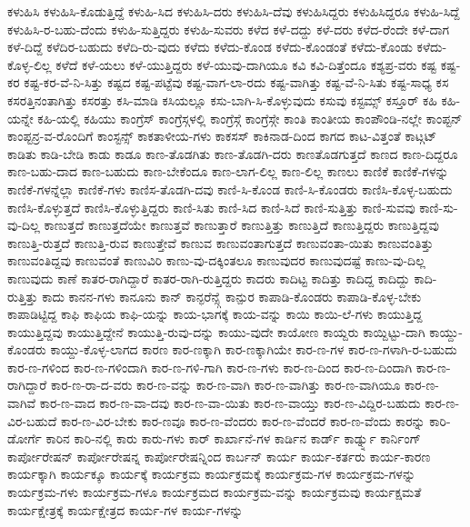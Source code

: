 {ಕಳುಹಿಸಿ
ಕಳುಹಿಸಿ-ಕೊಡುತ್ತಿದ್ದೆ
ಕಳುಹಿ-ಸಿದ
ಕಳುಹಿಸಿ-ದರು
ಕಳುಹಿಸಿ-ದೆವು
ಕಳುಹಿಸಿದ್ದರು
ಕಳುಹಿಸಿದ್ದರೂ
ಕಳುಹಿ-ಸಿದ್ದೆ
ಕಳುಹಿಸಿ-ರ-ಬಹು-ದೆಂದು
ಕಳುಹಿ-ಸುತ್ತಿದ್ದರು
ಕಳುಹಿ-ಸುವರು
ಕಳೆದ
ಕಳೆ-ದದ್ದು
ಕಳೆ-ದರು
ಕಳೆದ-ರೆಂದೇ
ಕಳೆ-ದಾಗ
ಕಳೆ-ದಿದ್ದೆ
ಕಳೆದಿರ-ಬಹುದು
ಕಳೆದಿ-ರು-ವುದು
ಕಳೆದು
ಕಳೆದು-ಕೊಂಡ
ಕಳೆದು-ಕೊಂಡಂತೆ
ಕಳೆದು-ಕೊಂಡು
ಕಳೆದು-ಕೊಳ್ಳ-ಲಿಲ್ಲ
ಕಳೆದೆ
ಕಳೆ-ಯಲು
ಕಳೆ-ಯುತ್ತಿದ್ದರು
ಕಳೆ-ಯುವು-ದಾಗಿಯೂ
ಕವಿ
ಕವಿ-ದಿತ್ತೆಂದೂ
ಕಶ್ಯಪ್ರ-ವರು
ಕಷ್ಟ
ಕಷ್ಟ-ಕರ
ಕಷ್ಟ-ಕರ-ವೆ-ನಿ-ಸಿತ್ತು
ಕಷ್ಟದ
ಕಷ್ಟ-ಪಟ್ಟೆವು
ಕಷ್ಟ-ವಾಗ-ಲಾ-ರದು
ಕಷ್ಟ-ವಾಗಿತ್ತು
ಕಷ್ಟ-ವೆ-ನಿ-ಸಿತು
ಕಷ್ಟ-ಸಾಧ್ಯ
ಕಸ
ಕಸರತ್ತಿನಂತಾಗಿತ್ತು
ಕಸರತ್ತು
ಕಸಿ-ಮಾಡಿ
ಕಸಿಯಲ್ಲೂ
ಕಸು-ಬಾಗಿ-ಸಿ-ಕೊಳ್ಳುವುದು
ಕಸುವು
ಕಸ್ಟಮ್ಸ್
ಕಸ್ತೂರ್
ಕಹಿ
ಕಹಿ-ಯನ್ನೇ
ಕಹಿ-ಯಲ್ಲಿ
ಕಹಿಯು
ಕಾಂಗ್ರೆಸ್
ಕಾಂಗ್ರೆಸ್ಗಳಲ್ಲಿ
ಕಾಂಗ್ರೆಸ್ಗೆ
ಕಾಂಗ್ರೆಸ್ಗೇ
ಕಾಂತಿ
ಕಾಂತೀಯ
ಕಾಂಪೌಂಡಿ-ನಲ್ಲೇ
ಕಾಂಪ್ಟನ್
ಕಾಂಪ್ಟನ್ರ-ವ-ರೊಂದಿಗೆ
ಕಾಂಸ್ಟನ್ಸ್
ಕಾಕತಾಳೀಯ-ಗಳು
ಕಾಕಸಸ್
ಕಾಕಿನಾಡ-ದಿಂದ
ಕಾಗದ
ಕಾಟ-ವಿತ್ತಂತೆ
ಕಾಟ್ಗಟ್
ಕಾಡಿತು
ಕಾಡಿ-ಬೇಡಿ
ಕಾಡು
ಕಾಡೂ
ಕಾಣ-ತೊಡಗಿತು
ಕಾಣ-ತೊಡಗಿ-ದರು
ಕಾಣತೊಡಗುತ್ತದೆ
ಕಾಣದ
ಕಾಣ-ದಿದ್ದರೂ
ಕಾಣ-ಬಹು-ದಾದ
ಕಾಣ-ಬಹುದು
ಕಾಣ-ಬೇಕೆಂದೂ
ಕಾಣ-ಲಾಗ-ಲಿಲ್ಲ
ಕಾಣ-ಲಿಲ್ಲ
ಕಾಣಲು
ಕಾಣಿಕೆ
ಕಾಣಿಕೆ-ಗಳನ್ನು
ಕಾಣಿಕೆ-ಗಳನ್ನೆಲ್ಲಾ
ಕಾಣಿಕೆ-ಗಳು
ಕಾಣಿಸ-ತೊಡಗಿ-ದವು
ಕಾಣಿ-ಸಿ-ಕೊಂಡ
ಕಾಣಿ-ಸಿ-ಕೊಂಡರು
ಕಾಣಿಸಿ-ಕೊಳ್ಳ-ಬಹುದು
ಕಾಣಿಸಿ-ಕೊಳ್ಳುತ್ತದೆ
ಕಾಣಿಸಿ-ಕೊಳ್ಳುತ್ತಿದ್ದರು
ಕಾಣಿ-ಸಿತು
ಕಾಣಿ-ಸಿದ
ಕಾಣಿ-ಸಿದೆ
ಕಾಣಿ-ಸುತ್ತಿತ್ತು
ಕಾಣಿ-ಸುವವು
ಕಾಣಿ-ಸು-ವು-ದಿಲ್ಲ
ಕಾಣುತ್ತದೆ
ಕಾಣುತ್ತದೆಯೇ
ಕಾಣುತ್ತವೆ
ಕಾಣುತ್ತಾರೆ
ಕಾಣುತ್ತಿತ್ತು
ಕಾಣುತ್ತಿದೆ
ಕಾಣುತ್ತಿದ್ದರು
ಕಾಣುತ್ತಿದ್ದವು
ಕಾಣುತ್ತಿ-ರುತ್ತದೆ
ಕಾಣುತ್ತಿ-ರುವ
ಕಾಣುತ್ತೇವೆ
ಕಾಣುವ
ಕಾಣುವಂತಾಗುತ್ತದೆ
ಕಾಣುವಂತಾ-ಯಿತು
ಕಾಣುವಂತಿತ್ತು
ಕಾಣುವಂತಿದ್ದವು
ಕಾಣುವಂತೆ
ಕಾಣುವಿರಿ
ಕಾಣು-ವು-ದಕ್ಕಿಂತಲೂ
ಕಾಣುವುದರ
ಕಾಣುವುದಷ್ಟೆ
ಕಾಣು-ವು-ದಿಲ್ಲ
ಕಾಣುವುದು
ಕಾಣೆ
ಕಾತರ-ರಾಗಿದ್ದಾರೆ
ಕಾತರ-ರಾಗಿ-ರುತ್ತಿದ್ದರು
ಕಾದರು
ಕಾದಿಟ್ಟ
ಕಾದಿತ್ತು
ಕಾದಿದ್ದ
ಕಾದಿದ್ದು
ಕಾದಿ-ರುತ್ತಿತ್ತು
ಕಾದು
ಕಾನನ-ಗಳು
ಕಾನೂನು
ಕಾನ್
ಕಾನ್ಫರೆನ್ಸ್ಗೆ
ಕಾನ್ಪುರ
ಕಾಪಾಡಿ-ಕೊಂಡರು
ಕಾಪಾಡಿ-ಕೊಳ್ಳ-ಬೇಕು
ಕಾಪಾಡಿಟ್ಟಿದ್ದ
ಕಾಫಿ
ಕಾಫಿಯ
ಕಾಫಿ-ಯನ್ನು
ಕಾಯ-ಭಾಗಕ್ಕೆ
ಕಾಯ-ವನ್ನು
ಕಾಯಿ
ಕಾಯಿ-ಲೆ-ಗಳು
ಕಾಯುತ್ತಿದ್ದ
ಕಾಯುತ್ತಿದ್ದವು
ಕಾಯುತ್ತಿದ್ದೇನೆ
ಕಾಯುತ್ತಿ-ರುವು-ದನ್ನು
ಕಾಯು-ವುದೇ
ಕಾಯೋಣ
ಕಾಯ್ದರು
ಕಾಯ್ದಿಟ್ಟು-ದಾಗಿ
ಕಾಯ್ದು-ಕೊಂಡರು
ಕಾಯ್ದು-ಕೊಳ್ಳ-ಲಾಗದ
ಕಾರಣ
ಕಾರ-ಣಕ್ಕಾಗಿ
ಕಾರ-ಣಕ್ಕಾಗಿಯೇ
ಕಾರ-ಣ-ಗಳ
ಕಾರ-ಣ-ಗಳಾಗಿ-ರ-ಬಹುದು
ಕಾರ-ಣ-ಗಳಿಂದ
ಕಾರ-ಣ-ಗಳಿಂದಾಗಿ
ಕಾರ-ಣ-ಗಳಿ-ಗಾಗಿ
ಕಾರ-ಣ-ಗಳು
ಕಾರ-ಣ-ದಿಂದ
ಕಾರ-ಣ-ದಿಂದಾಗಿ
ಕಾರ-ಣ-ರಾಗಿದ್ದಾರೆ
ಕಾರ-ಣ-ರಾ-ದ-ವರು
ಕಾರ-ಣ-ವನ್ನು
ಕಾರ-ಣ-ವಾಗಿ
ಕಾರ-ಣ-ವಾಗಿತ್ತು
ಕಾರ-ಣ-ವಾಗಿಯೂ
ಕಾರ-ಣ-ವಾಗಿವೆ
ಕಾರ-ಣ-ವಾದ
ಕಾರ-ಣ-ವಾ-ದವು
ಕಾರ-ಣ-ವಾ-ಯಿತು
ಕಾರ-ಣ-ವಾಯ್ತು
ಕಾರ-ಣ-ವಿದ್ದಿರ-ಬಹುದು
ಕಾರ-ಣ-ವಿರ-ಬಹುದೆ
ಕಾರ-ಣ-ವಿರ-ಬೇಕು
ಕಾರ-ಣವೂ
ಕಾರ-ಣ-ವೆಂದರು
ಕಾರ-ಣ-ವೆಂದರೆ
ಕಾರ-ಣ-ವೆಂದು
ಕಾರನ್ನು
ಕಾರಿ-ಡೋರ್ಗೆ
ಕಾರಿನ
ಕಾರಿ-ನಲ್ಲಿ
ಕಾರು
ಕಾರು-ಗಳು
ಕಾರ್
ಕಾರ್ಖಾನೆ-ಗಳ
ಕಾರ್ಡಿನ
ಕಾರ್ಡ್
ಕಾರ್ಡ್ನ್ನು
ಕಾರ್ನಿಂಗ್
ಕಾರ್ಪೋರೇಷನ್
ಕಾರ್ಪೋರೇಷನ್ನ
ಕಾರ್ಪೋರೇಷನ್ನಿಂದ
ಕಾರ್ಬನ್
ಕಾರ್ಯ
ಕಾರ್ಯ-ಕರ್ತರು
ಕಾರ್ಯ-ಕಾರಣ
ಕಾರ್ಯಕ್ಕಾಗಿ
ಕಾರ್ಯಕ್ಕೂ
ಕಾರ್ಯಕ್ಕೆ
ಕಾರ್ಯಕ್ರಮ
ಕಾರ್ಯಕ್ರಮಕ್ಕೆ
ಕಾರ್ಯಕ್ರಮ-ಗಳ
ಕಾರ್ಯಕ್ರಮ-ಗಳನ್ನು
ಕಾರ್ಯಕ್ರಮ-ಗಳು
ಕಾರ್ಯಕ್ರಮ-ಗಳೂ
ಕಾರ್ಯಕ್ರಮದ
ಕಾರ್ಯಕ್ರಮ-ವನ್ನು
ಕಾರ್ಯಕ್ರಮವು
ಕಾರ್ಯಕ್ಷಮತೆ
ಕಾರ್ಯಕ್ಷೇತ್ರಕ್ಕೆ
ಕಾರ್ಯಕ್ಷೇತ್ರದ
ಕಾರ್ಯ-ಗಳ
ಕಾರ್ಯ-ಗಳನ್ನು
}
